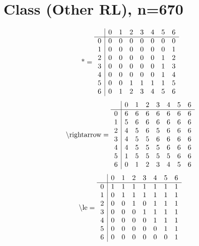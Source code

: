 \documentclass[11pt]{article}
\begin{document}
\section{Class (Other RL), n=670}
\[\text{*} = 
\begin{array}{r | r r r r r r r}
 & 0 & 1 & 2 & 3 & 4 & 5 & 6 \\ \hline
0 & 0 & 0 & 0 & 0 & 0 & 0 & 0 \\
1 & 0 & 0 & 0 & 0 & 0 & 0 & 1 \\
2 & 0 & 0 & 0 & 0 & 0 & 1 & 2 \\
3 & 0 & 0 & 0 & 0 & 0 & 1 & 3 \\
4 & 0 & 0 & 0 & 0 & 0 & 1 & 4 \\
5 & 0 & 0 & 1 & 1 & 1 & 1 & 5 \\
6 & 0 & 1 & 2 & 3 & 4 & 5 & 6 \\
\end{array}
\]
\[\text{\textbackslash rightarrow} = 
\begin{array}{r | r r r r r r r}
 & 0 & 1 & 2 & 3 & 4 & 5 & 6 \\ \hline
0 & 6 & 6 & 6 & 6 & 6 & 6 & 6 \\
1 & 5 & 6 & 6 & 6 & 6 & 6 & 6 \\
2 & 4 & 5 & 6 & 5 & 6 & 6 & 6 \\
3 & 4 & 5 & 5 & 6 & 6 & 6 & 6 \\
4 & 4 & 5 & 5 & 5 & 6 & 6 & 6 \\
5 & 1 & 5 & 5 & 5 & 5 & 6 & 6 \\
6 & 0 & 1 & 2 & 3 & 4 & 5 & 6 \\
\end{array}
\]
\[\text{\textbackslash le} = 
\begin{array}{r | r r r r r r r}
 & 0 & 1 & 2 & 3 & 4 & 5 & 6 \\ \hline
0 & 1 & 1 & 1 & 1 & 1 & 1 & 1 \\
1 & 0 & 1 & 1 & 1 & 1 & 1 & 1 \\
2 & 0 & 0 & 1 & 0 & 1 & 1 & 1 \\
3 & 0 & 0 & 0 & 1 & 1 & 1 & 1 \\
4 & 0 & 0 & 0 & 0 & 1 & 1 & 1 \\
5 & 0 & 0 & 0 & 0 & 0 & 1 & 1 \\
6 & 0 & 0 & 0 & 0 & 0 & 0 & 1 \\
\end{array}
\]
\end{document}
